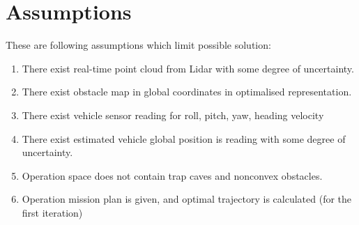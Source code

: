 \section{Assumptions}

These are following assumptions which limit possible solution:
\begin{enumerate}
	\item There exist real-time point cloud from Lidar with some degree of uncertainty.
	\item There exist obstacle map in global coordinates in optimalised representation.
	\item There exist vehicle sensor reading for roll, pitch, yaw, heading velocity
	\item There exist estimated vehicle global position is reading with some degree of uncertainty.
	\item Operation space does not contain trap caves and nonconvex obstacles.
	\item Operation mission plan is given, and optimal trajectory is calculated (for the first iteration)
\end{enumerate}